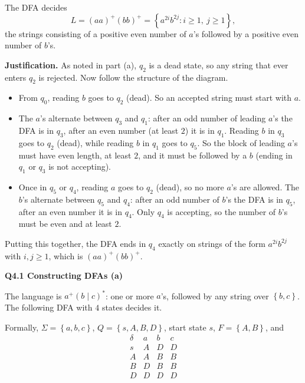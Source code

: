 \documentclass[11pt]{article}
\newcommand{\set}[1]{\left\{#1\right\}}
\newcommand{\qpage}[1]{\clearpage\noindent\textbf{\large #1}\par\medskip}
\begin{document}
The DFA decides
\[
  L = (aa)^+ (bb)^+ = \set{a^{2i} b^{2j} : i \ge 1,\ j \ge 1},
\]
the strings consisting of a positive even number of $a$'s followed by a positive even number of $b$'s.

\textbf{Justification.}
As noted in part (a), $q_2$ is a dead state, so any string that ever enters $q_2$ is rejected.
Now follow the structure of the diagram.
\begin{itemize}
  \item From $q_0$, reading $b$ goes to $q_2$ (dead). So an accepted string must start with $a$.
  \item The $a$'s alternate between $q_3$ and $q_1$: after an odd number of leading $a$'s the DFA is in $q_3$, after an even number (at least $2$) it is in $q_1$.
  Reading $b$ in $q_3$ goes to $q_2$ (dead), while reading $b$ in $q_1$ goes to $q_5$.
  So the block of leading $a$'s must have even length, at least $2$, and it must be followed by a $b$ (ending in $q_1$ or $q_3$ is not accepting).
  \item Once in $q_5$ or $q_4$, reading $a$ goes to $q_2$ (dead), so no more $a$'s are allowed.
  The $b$'s alternate between $q_5$ and $q_4$: after an odd number of $b$'s the DFA is in $q_5$, after an even number it is in $q_4$.
  Only $q_4$ is accepting, so the number of $b$'s must be even and at least $2$.
\end{itemize}
Putting this together, the DFA ends in $q_4$ exactly on strings of the form $a^{2i} b^{2j}$ with $i, j \ge 1$, which is $(aa)^+(bb)^+$.

\qpage{Q4.1 Constructing DFAs (a)}

The language is $a^+(b \mid c)^*$: one or more $a$'s, followed by any string over $\set{b,c}$.
The following DFA with $4$ states decides it.

\begin{center}
\end{center}

Formally, $\Sigma = \set{a,b,c}$, $Q = \set{s, A, B, D}$, start state $s$, $F = \set{A, B}$, and
\[
  \begin{array}{c|ccc}
    \delta & a & b & c \\ \hline
    s & A & D & D \\
    A & A & B & B \\
    B & D & B & B \\
    D & D & D & D
  \end{array}
\]
\end{document}
